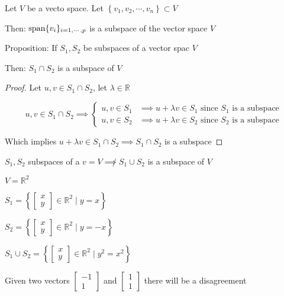 \begin{example}
	Let $V$ be a vecto space. Let $\left\{v_1, v_2, \cdots, v_n\right\} \subset V$

	Then: $\mathrm{span}\{v_i\}_{i=1, \cdots, p}$ is a subspace of the vector space $V$
\end{example}

\begin{example}
	Proposition: If $S_1, S_2$ be subspaces of a vector spac $V$

	Then: $S_1 \cap S_2$ is a subspace of $V$
\end{example}

\begin{proof}
	Let $u, v \in S_1 \cap S_2$, let $\lambda \in \mathbb{R}$

	\begin{equation}
		u, v \in S_1 \cap S_2 \implies \begin{cases}
			u, v \in S_1 &\implies u + \lambda v \in S_1 \text{ since } S_1 \text{ is a subspace}\\
			u, v \in S_2 &\implies u + \lambda v \in S_2 \text{ since } S_2 \text{ is a subspace}
		\end{cases}
	\end{equation}

	Which implies $u + \lambda v \in S_1 \cap S_2 \implies S_1 \cap S_2$ is a subspace
\end{proof}

\begin{remark}
	$S_1, S_2$ subspaces of a $v = V \not\implies S_1 \cup S_2$ is a subspace of $V$
\end{remark}

\begin{example}
	$ $\\
	$V = \mathbb{R}^2$

	$S_1 = \left\{\begin{bmatrix}
		x\\y
	\end{bmatrix} \in \mathbb{R}^2 \mid y = x\right\}$

	$S_2 = \left\{\begin{bmatrix}
		x\\y
	\end{bmatrix} \in \mathbb{R}^2 \mid y = -x\right\}$

	$S_1 \cup S_2 = \left\{\begin{bmatrix}
		x\\y
	\end{bmatrix} \in \mathbb{R}^2 \mid y^2 = x^2\right\}$

	Given two vectors $\begin{bmatrix}
		-1\\1
	\end{bmatrix}$ and $\begin{bmatrix}
		1\\1
	\end{bmatrix}$ there will be a disagreement
\end{example}

